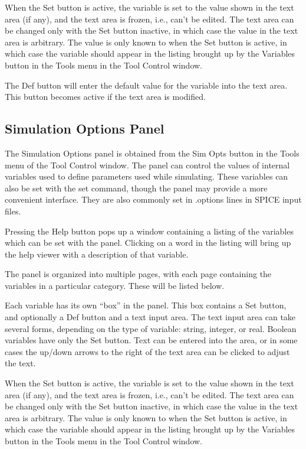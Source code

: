 When the {\cb Set} button is active, the variable is set to the value
shown in the text area (if any), and the text area is frozen, i.e.,
can't be edited.  The text area can be changed only with the {\cb Set}
button inactive, in which case the value in the text area is
arbitrary.  The value is only known to {\WRspice} when the {\cb Set}
button is active, in which case the variable should appear in the
listing brought up by the {\cb Variables} button in the {\cb Tools}
menu in the {\cb Tool Control} window.

The {\cb Def} button will enter the default value for the variable
into the text area.  This button becomes active if the text area is
modified.

\subsection{Simulation Options Panel}
\label{simopts}

The {\cb Simulation Options} panel is obtained from the {\cb Sim Opts}
button in the {\cb Tools} menu of the {\cb Tool Control} window.  The
panel can control the values of internal variables used to define
parameters used while simulating.  These variables can also be set
with the {\cb set} command, though the panel may provide a more
convenient interface.  They are also commonly set in {\vt .options}
lines in SPICE input files.

Pressing the {\cb Help} button pops up a window containing a listing
of the variables which can be set with the panel.  Clicking on a word
in the listing will bring up the help viewer with a description of
that variable.

The panel is organized into multiple pages, with each page containing
the variables in a particular category.  These will be listed below.

Each variable has its own ``box'' in the panel.  This box contains a
{\cb Set} button, and optionally a {\cb Def} button and a text input
area.  The text input area can take several forms, depending on the
type of variable:  string, integer, or real.  Boolean variables have
only the {\cb Set} button.  Text can be entered into the area, or in
some cases the up/down arrows to the right of the text area can be
clicked to adjust the text.

When the {\cb Set} button is active, the variable is set to the value
shown in the text area (if any), and the text area is frozen, i.e.,
can't be edited.  The text area can be changed only with the {\cb Set}
button inactive, in which case the value in the text area is
arbitrary.  The value is only known to {\WRspice} when the {\cb Set}
button is active, in which case the variable should appear in the
listing brought up by the {\cb Variables} button in the {\cb Tools}
menu in the {\cb Tool Control} window.


